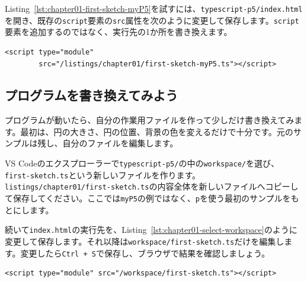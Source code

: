 \begin{listing}[htbp]
\inputminted{ts}{typescript-p5/listings/chapter01/first-sketch-myP5.ts}
\caption{最初のp5.jsスケッチの\texttt{p}を\texttt{myP5}に変更した例（\texttt{chapter01/first-sketch-myP5.ts}）}
\label{lst:chapter01-first-sketch-myP5}
\end{listing}

Listing~\ref{lst:chapter01-first-sketch-myP5}を試すには、\texttt{typescript-p5/index.html}を開き、既存の\texttt{script}要素の\texttt{src}属性を次のように変更して保存します。\texttt{script}要素を追加するのではなく、実行先の1か所を書き換えます。

\begin{listing}[htbp]
\begin{verbatim}
<script type="module"
        src="/listings/chapter01/first-sketch-myP5.ts"></script>
\end{verbatim}
\caption{\texttt{myP5}を使ったサンプルに実行先を切り替える}
\label{lst:chapter01-select-myP5}
\end{listing}

\subsection{プログラムを書き換えてみよう}

プログラムが動いたら、自分の作業用ファイルを作って少しだけ書き換えてみます。最初は、円の大きさ、円の位置、背景の色を変えるだけで十分です。元のサンプルは残し、自分のファイルを編集します。

VS Codeのエクスプローラーで\texttt{typescript-p5/}の中の\texttt{workspace/}を選び、\texttt{first-sketch.ts}という新しいファイルを作ります。\texttt{listings/chapter01/first-sketch.ts}の内容全体を新しいファイルへコピーして保存してください。ここでは\texttt{myP5}の例ではなく、\texttt{p}を使う最初のサンプルをもとにします。

続いて\texttt{index.html}の実行先を、Listing~\ref{lst:chapter01-select-workspace}のように変更して保存します。それ以降は\texttt{workspace/first-sketch.ts}だけを編集します。変更したら\texttt{Ctrl + S}で保存し、ブラウザで結果を確認しましょう。

\begin{listing}[htbp]
\begin{verbatim}
<script type="module" src="/workspace/first-sketch.ts"></script>
\end{verbatim}
\caption{自分の作業用ファイルを直接実行する}
\label{lst:chapter01-select-workspace}
\end{listing}

